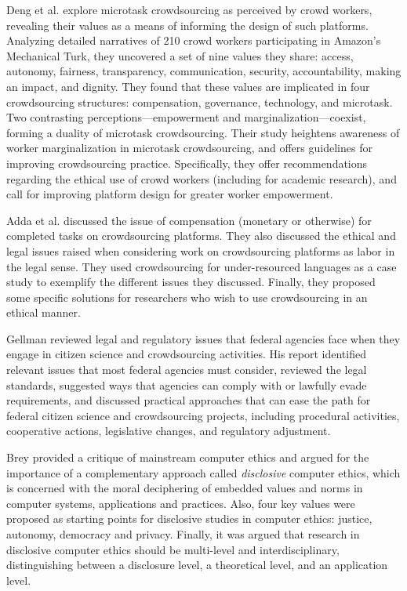 \documentclass[11pt]{article}
\begin{document}
Deng et al. \cite{deng2016duality} explore microtask crowdsourcing as perceived by crowd workers, revealing their values as a means of informing the design of such platforms. Analyzing detailed narratives of 210 crowd workers participating in Amazon's Mechanical Turk, they uncovered a set of nine values they share: access, autonomy, fairness, transparency, communication, security, accountability, making an impact, and dignity. They found that these values are implicated in four crowdsourcing structures: compensation, governance, technology, and microtask. Two contrasting perceptions—empowerment and marginalization—coexist, forming a duality of microtask crowdsourcing. Their study heightens awareness of worker marginalization in microtask crowdsourcing, and offers guidelines for improving crowdsourcing practice. Specifically, they offer recommendations regarding the ethical use of crowd workers (including for academic research), and call for improving platform design for greater worker empowerment.

Adda et al. \cite{adda2014crowdsourcing} discussed the issue of compensation (monetary or otherwise) for completed tasks on crowdsourcing platforms. They also discussed the ethical and legal issues raised when considering work on crowdsourcing platforms as labor in the legal sense. They used crowdsourcing
for under-resourced languages as a case study to exemplify
the different issues they discussed. Finally, they proposed some specific solutions for researchers who wish to use crowdsourcing in an ethical manner. 

Gellman \cite{gellman2015crowdsourcing} reviewed legal and regulatory issues that federal agencies face when
they engage in citizen science and crowdsourcing activities. His report identified relevant issues that most federal agencies must consider, reviewed the legal standards, suggested ways that agencies can comply with or lawfully evade requirements, and discussed practical approaches
that can ease the path for federal citizen science and crowdsourcing projects, including
procedural activities, cooperative actions, legislative changes, and regulatory adjustment.

Brey \cite{brey2000disclosive} provided a critique of mainstream computer ethics and argued for the importance of a complementary approach called \textit{disclosive} computer ethics, which is concerned with the moral deciphering of embedded values and norms in computer systems, applications and practices. Also, four key values were proposed as starting points for disclosive studies in computer ethics: justice, autonomy, democracy and privacy. Finally, it was argued that research in disclosive computer ethics should be multi-level and interdisciplinary, distinguishing between a disclosure level, a theoretical level, and an application level.
\end{document}
